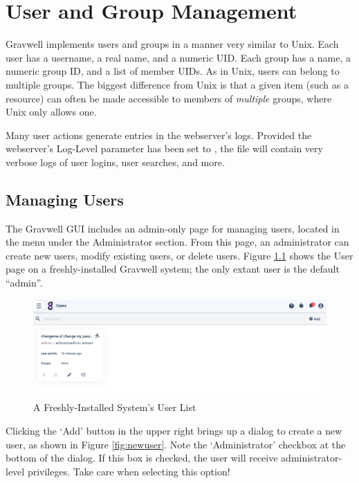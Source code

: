 \chapter{User and Group Management}

Gravwell implements users and groups in a manner very similar to Unix.
Each user has a username, a real name, and a numeric UID. Each group has
a name, a numeric group ID, and a list of member UIDs. As in Unix, users
can belong to multiple groups. The biggest difference from Unix is that
a given item (such as a resource) can often be made accessible to
members of \emph{multiple} groups, where Unix only allows one.

Many user actions generate entries in the webserver's logs. Provided
the webserver's Log-Level parameter has been set to , the
file  will contain very verbose logs
of user logins, user searches, and more.

\section{Managing Users}

The Gravwell GUI includes an admin-only page for managing users,
located in the menu under the Administrator section. From this page, an
administrator can create new users, modify existing users, or delete
users. Figure \ref{fig:fresh-users} shows the User page on a freshly-installed
Gravwell system; the only extant user is the default ``admin''.

\begin{figure}
	\includegraphics{images/users-admin.png}
	\caption{A Freshly-Installed System's User List}
	\label{fig:fresh-users}
\end{figure}

Clicking the `Add' button in the upper right brings up a dialog to
create a new user, as shown in Figure \ref{fig:newuser}. Note the 
`Administrator' checkbox at the bottom of the dialog. If this
box is checked, the user will receive administrator-level privileges.
Take care when selecting this option!


